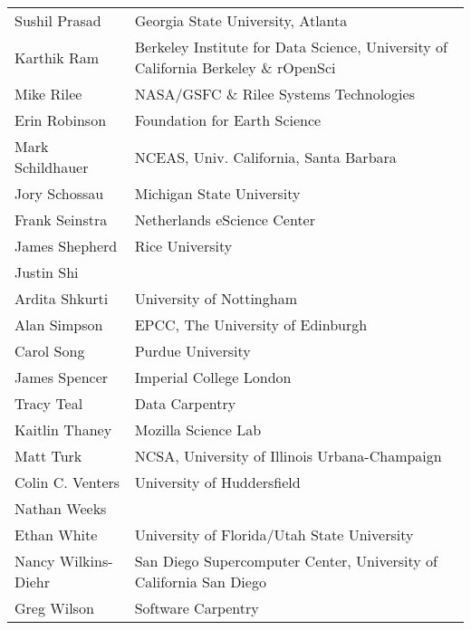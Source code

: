 \documentclass[11pt, oneside]{amsart}
\begin{document}
{\begin{longtable}{ll}
\\ Sushil Prasad         &  Georgia State University, Atlanta
\\ Karthik Ram           &  Berkeley Institute for Data Science, University of California Berkeley \& rOpenSci
\\ Mike Rilee            &  NASA/GSFC \& Rilee Systems Technologies
\\ Erin Robinson         &  Foundation for Earth Science
\\ Mark Schildhauer      &  NCEAS, Univ. California, Santa Barbara
\\ Jory Schossau         &  Michigan State University
\\ Frank Seinstra        &  Netherlands eScience Center
\\ James Shepherd        &  Rice University
\\ Justin Shi
\\ Ardita Shkurti        &  University of Nottingham
\\ Alan Simpson          &  EPCC, The University of Edinburgh
\\ Carol Song            &  Purdue University
\\ James Spencer         &  Imperial College London
\\ Tracy Teal            &  Data Carpentry
\\ Kaitlin Thaney        &  Mozilla Science Lab
\\ Matt Turk             &  NCSA, University of Illinois Urbana-Champaign
\\ Colin C. Venters      &  University of Huddersfield
\\ Nathan Weeks
\\ Ethan White           &  University of Florida/Utah State University
\\ Nancy Wilkins-Diehr   &  San Diego Supercomputer Center, University of California San Diego
\\ Greg Wilson           &  Software Carpentry
\end{longtable}
}
















\end{document}
